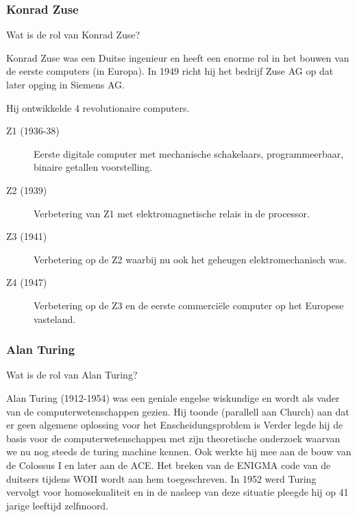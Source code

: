 \documentclass[../main.tex]{subfiles}
\begin{document}
\subsubsection{Konrad Zuse}
\begin{question}
Wat is de rol van Konrad Zuse?
\end{question}
\begin{solution}
Konrad Zuse was een Duitse ingenieur en heeft een enorme rol in het bouwen van de eerste computers (in Europa).
In 1949 richt hij het bedrijf Zuse AG op dat later opging in Siemens AG.

Hij ontwikkelde 4 revolutionaire computers.
\begin{description}
		\item[Z1 (1936-38)] Eerste digitale computer met mechanische schakelaars, programmeerbaar, binaire getallen voorstelling.
		\item[Z2 (1939)] Verbetering van Z1 met elektromagnetische relais in de processor.
		\item[Z3 (1941)] Verbetering op de Z2 waarbij nu ook het geheugen elektromechanisch was.
		\item[Z4 (1947)] Verbetering op de Z3 en de eerste commerci\"ele computer op het Europese vasteland.
\end{description}
\end{solution}

\subsubsection{Alan Turing}
\begin{question}
Wat is de rol van Alan Turing?
\end{question}
\begin{solution}
Alan Turing (1912-1954) was een geniale engelse wiskundige en wordt als vader van de computerwetenschappen gezien.
Hij toonde (parallell aan Church) aan dat er geen algemene oplossing voor het Enscheidungsproblem is
Verder legde hij de basis voor de computerwetenschappen met zijn theoretische onderzoek waarvan we nu nog steeds de turing machine kennen.
Ook werkte hij mee aan de bouw van de Colossus I en later aan de ACE.
Het breken van de ENIGMA code van de duitsers tijdens WOII wordt aan hem toegeschreven.
In 1952 werd Turing vervolgt voor homosekualiteit en in de nasleep van deze situatie pleegde hij op 41 jarige leeftijd zelfmoord.

\end{solution}
\end{document}
